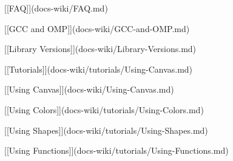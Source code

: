 
\begin{DoxyItemize}
\item \mbox{[}\mbox{[}\-F\-A\-Q\mbox{]}\mbox{]}(docs-\/wiki/\-F\-A\-Q.\-md)
\item \mbox{[}\mbox{[}\-G\-C\-C and \-O\-M\-P\mbox{]}\mbox{]}(docs-\/wiki/\-G\-C\-C-\/and-\/\-O\-M\-P.\-md)
\item \mbox{[}\mbox{[}\-Library \-Versions\mbox{]}\mbox{]}(docs-\/wiki/\-Library-\/\-Versions.\-md)
\item \mbox{[}\mbox{[}\-Tutorials\mbox{]}\mbox{]}(docs-\/wiki/tutorials/\-Using-\/\-Canvas.\-md)
\begin{DoxyItemize}
\item \mbox{[}\mbox{[}\-Using \-Canvas\mbox{]}\mbox{]}(docs-\/wiki/\-Using-\/\-Canvas.\-md)
\item \mbox{[}\mbox{[}\-Using \-Colors\mbox{]}\mbox{]}(docs-\/wiki/tutorials/\-Using-\/\-Colors.\-md)
\item \mbox{[}\mbox{[}\-Using \-Shapes\mbox{]}\mbox{]}(docs-\/wiki/tutorials/\-Using-\/\-Shapes.\-md)
\item \mbox{[}\mbox{[}\-Using \-Functions\mbox{]}\mbox{]}(docs-\/wiki/tutorials/\-Using-\/\-Functions.\-md)
\end{DoxyItemize}
\end{DoxyItemize}